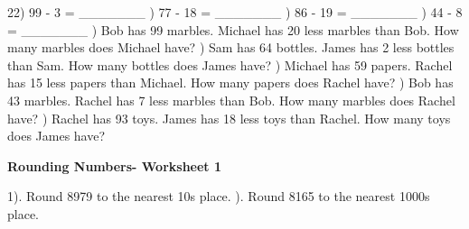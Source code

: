 \documentclass{article}%
\begin{document}
22) 99 {-} 3 = \_\_\_\_\_\_\_%
\newline%
\newline%
) 77 {-} 18 = \_\_\_\_\_\_\_%
\newline%
\newline%
) 86 {-} 19 = \_\_\_\_\_\_\_%
\newline%
\newline%
) 44 {-} 8 = \_\_\_\_\_\_\_%
\newline%
\newline%
) Bob has 99 marbles. Michael has 20 less marbles than Bob. How many marbles does Michael have?%
\newline%
\newline%
) Sam has 64 bottles. James has 2 less bottles than Sam. How many bottles does James have?%
\newline%
\newline%
) Michael has 59 papers. Rachel has 15 less papers than Michael. How many papers does Rachel have?%
\newline%
\newline%
) Bob has 43 marbles. Rachel has 7 less marbles than Bob. How many marbles does Rachel have?%
\newline%
\newline%
) Rachel has 93 toys. James has 18 less toys than Rachel. How many toys does James have?%
\newline%
\newline%
\newline%
\pagebreak%
\large%
\begin{center}%
\textbf{Rounding Numbers- Worksheet 1}%
\newline%
\newline%
\newline%
\end{center} \normalsize%
1). Round 8979 to the nearest 10s place.%
\newline%
\newline%
). Round 8165 to the nearest 1000s place.%
\newline%
\newline%
\end{document}
